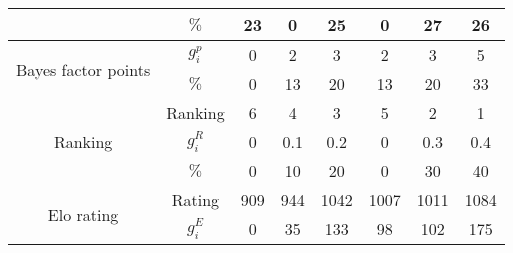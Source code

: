 \begin{tabular}{|cc|c|c|c|c|c|c|}
          & $\%$ &                                       23 &                                        0 &                                       25 &                                        0 &                                       27 &                                       26 \\
\cline{1-8}
\hline \multirow{2}{*}{Bayes factor points} & $g_i^p$ &                                        0 &                                        2 &                                        3 &                                        2 &                                        3 &                                        5 \\
          & $\%$ &                                        0 &                                       13 &                                       20 &                                       13 &                                       20 &                                       33 \\
\cline{1-8}
\hline \multirow{3}{*}{Ranking} & Ranking &                                        6 &                                        4 &                                        3 &                                        5 &                                        2 &                                        1 \\
          & $g_i^R$ &                                        0 &                                      0.1 &                                      0.2 &                                        0 &                                      0.3 &                                      0.4 \\
          & $\%$ &                                        0 &                                       10 &                                       20 &                                        0 &                                       30 &                                       40 \\
\cline{1-8}
\hline \multirow{3}{*}{Elo rating} & Rating &                                      909 &                                      944 &                                     1042 &                                     1007 &                                     1011 &                                     1084 \\
          & $g_i^E$ &                                        0 &                                       35 &                                      133 &                                       98 &                                      102 &                                      175 \\

\end{tabular}
